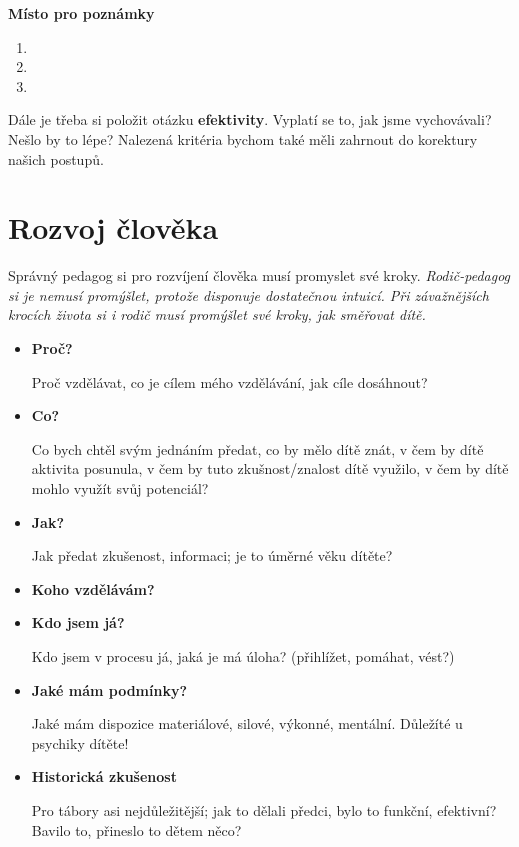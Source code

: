 \documentclass[a4paper,12pt,final]{report}
\begin{document}
\begin{samepage}\begin{flushleft}
\end{flushleft}
\textbf{Místo pro poznámky}
\begin{enumerate}
    \item 
    \item 
    \item 
\end{enumerate}
\vspace{2cm}\pagelogos
\end{samepage}

Dále je třeba si položit otázku \textbf{efektivity}. Vyplatí se to, jak jsme vychovávali? Nešlo by to lépe? Nalezená kritéria bychom také měli zahrnout do korektury našich postupů.

\section{Rozvoj člověka}\pagelogos
Správný pedagog si pro rozvíjení člověka musí promyslet své kroky.
\textit{Rodič-pedagog si je nemusí promýšlet, protože disponuje dostatečnou intuicí. Při závažnějších krocích života si i rodič musí promýšlet své kroky, jak směřovat dítě.}

\begin{itemize}
 \item \textbf{Proč?}
 
Proč vzdělávat, co je cílem mého vzdělávání, jak cíle dosáhnout?

\item \textbf{Co?}

Co bych chtěl svým jednáním předat, co by mělo dítě znát, v čem by dítě aktivita posunula, v čem by tuto zkušnost/znalost dítě využilo, v čem by dítě mohlo využít svůj potenciál?

\item \textbf{Jak?}

Jak předat zkušenost, informaci; je to úměrné věku dítěte?

\item \textbf{Koho vzdělávám?}
\item \textbf{Kdo jsem já?}

Kdo jsem v procesu já, jaká je má úloha? \small{(přihlížet, pomáhat, vést?)}

\item \textbf{Jaké mám podmínky?}

Jaké mám dispozice materiálové, silové, výkonné, mentální. Důležíté u psychiky dítěte!

\item \textbf{Historická zkušenost}

Pro tábory asi nejdůležitější; jak to dělali předci, bylo to funkční, efektivní? Bavilo to, přineslo to dětem něco?
\end{itemize}
\end{document}
